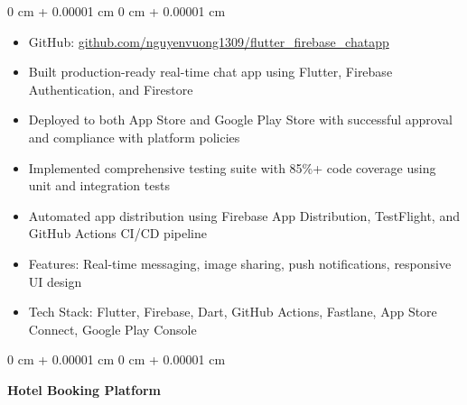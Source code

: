 \documentclass[10pt, letterpaper]{article}
\newenvironment{highlights}{
    \begin{itemize}[
        topsep=0.10 cm,
        parsep=0.10 cm,
        partopsep=0pt,
        itemsep=0pt,
        leftmargin=0 cm + 10pt
    ]
}{
    \end{itemize}
} %
\newenvironment{onecolentry}{
    \begin{adjustwidth}{
        0 cm + 0.00001 cm
    }{
        0 cm + 0.00001 cm
    }
}{
    \end{adjustwidth}
} %
\newenvironment{twocolentry}[2][]{
    \onecolentry
    \def\secondColumn{#2}
    \setcolumnwidth{\fill, 4.5 cm}
    \begin{paracol}{2}
}{
    \switchcolumn \raggedleft \secondColumn
    \end{paracol}
    \endonecolentry
} %
\begin{document}
        \vspace{0.15 cm}
        \begin{onecolentry}
            \begin{highlights}
                \item GitHub: \href{https://github.com/nguyenvuong1309/flutter_firebase_chatapp}{github.com/nguyenvuong1309/flutter\_firebase\_chatapp}
                \item Built production-ready real-time chat app using Flutter, Firebase Authentication, and Firestore
                \item Deployed to both App Store and Google Play Store with successful approval and compliance with platform policies
                \item Implemented comprehensive testing suite with 85\%+ code coverage using unit and integration tests
                \item Automated app distribution using Firebase App Distribution, TestFlight, and GitHub Actions CI/CD pipeline
                \item Features: Real-time messaging, image sharing, push notifications, responsive UI design
                \item Tech Stack: Flutter, Firebase, Dart, GitHub Actions, Fastlane, App Store Connect, Google Play Console
            \end{highlights}
        \end{onecolentry}

        \vspace{0.2 cm}

        \begin{twocolentry}{
            2023
        }
            \textbf{Hotel Booking Platform}
        \end{twocolentry}
\end{document}
